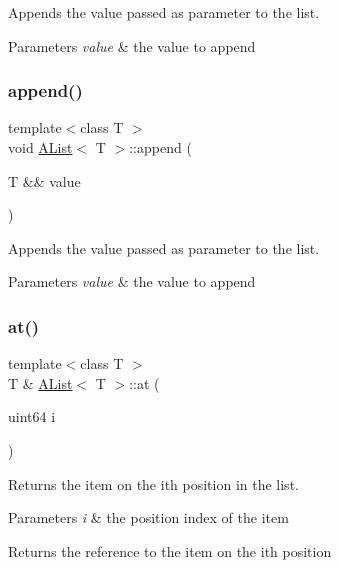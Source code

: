 Appends the value passed as parameter to the list. 


\begin{DoxyParams}{Parameters}
{\em value} & the value to append \\
\hline
\end{DoxyParams}
\mbox{\label{class_a_list_ac8e33a3962d74310ebafc8d99be5437a}} 
\subsubsection{\texorpdfstring{append()}{append()}\hspace{0.1cm}{\footnotesize\ttfamily [2/2]}}
{\footnotesize\ttfamily template$<$class T $>$ \\
void \mbox{\hyperlink{class_a_list}{A\+List}}$<$ T $>$\+::append (\begin{DoxyParamCaption}\item[{T \&\&}]{value }\end{DoxyParamCaption})}



Appends the value passed as parameter to the list. 


\begin{DoxyParams}{Parameters}
{\em value} & the value to append \\
\hline
\end{DoxyParams}
\mbox{\label{class_a_list_a3d5b7d06f274500c8b6fd3023b901b8b}} 
\subsubsection{\texorpdfstring{at()}{at()}\hspace{0.1cm}{\footnotesize\ttfamily [1/2]}}
{\footnotesize\ttfamily template$<$class T $>$ \\
T \& \mbox{\hyperlink{class_a_list}{A\+List}}$<$ T $>$\+::at (\begin{DoxyParamCaption}\item[{uint64}]{i }\end{DoxyParamCaption})}



Returns the item on the ith position in the list. 


\begin{DoxyParams}{Parameters}
{\em i} & the position index of the item \\
\hline
\end{DoxyParams}
\begin{DoxyReturn}{Returns}
the reference to the item on the ith position 
\end{DoxyReturn}
\mbox{\label{class_a_list_a9ad261a0e55e749c88921de518b1a6d1}} 
